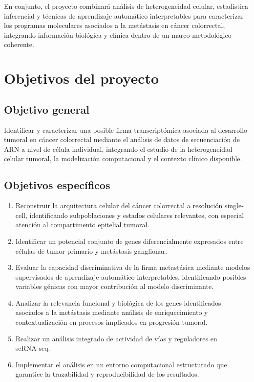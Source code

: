 \documentclass[11pt]{article}
\begin{document}
		
		En conjunto, el proyecto combinará análisis de heterogeneidad celular, estadística inferencial y técnicas de aprendizaje automático interpretables para caracterizar los programas moleculares asociados a la metástasis en cáncer colorrectal, integrando información biológica y clínica dentro de un marco metodológico coherente.
		
		
	\section{Objetivos del proyecto}
		
		\subsection{Objetivo general}
			Identificar y caracterizar una posible firma transcriptómica asociada al desarrollo tumoral en cáncer colorrectal mediante el análisis de datos de secuenciación de ARN a nivel de célula individual, integrando el estudio de la heterogeneidad celular tumoral, la modelización computacional y el contexto clínico disponible.
			
		\subsection{Objetivos específicos}
			\begin{enumerate}
				\item Reconstruir la arquitectura celular del cáncer colorrectal a resolución single-cell, identificando subpoblaciones y estados celulares relevantes, con especial atención al compartimento epitelial tumoral.
				
				\item Identificar un potencial conjunto de genes diferencialmente expresados entre células de tumor primario y metástasis ganglionar.
				
				\item Evaluar la capacidad discriminativa de la firma metastásica mediante modelos supervisados de aprendizaje automático interpretables, identificando posibles variables génicas con mayor contribución al modelo discriminante.
				
				\item Analizar la relevancia funcional y biológica de los genes identificados asociados a la metástasis mediante análisis de enriquecimiento y contextualización en procesos implicados en progresión tumoral.
				
				\item Realizar un análisis integrado de actividad de vías y reguladores en scRNA‑seq.
				
				\item Implementar el análisis en un entorno computacional estructurado que garantice la trazabilidad y reproducibilidad de los resultados.
			\end{enumerate}
		
\end{document}
